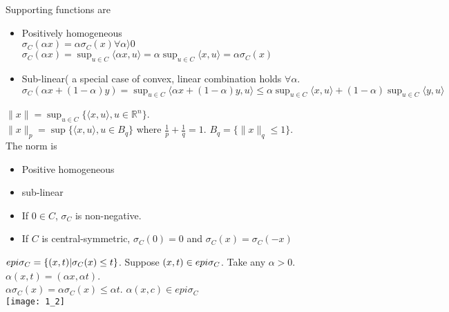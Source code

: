 \documentclass[11pt]{book} %
\def\R{\mathbb{R}}
\begin{document}
Supporting functions are
\begin{itemize}
\item Positively homogeneous\\
$\sigma_C(\alpha x) = \alpha \sigma_C(x) \forall \alpha \rangle  0$ \\
$\sigma_C(\alpha x ) = \sup_{u \in C} \langle \alpha x, u\rangle  = \alpha \sup_{u \in C} \langle x, u\rangle  = \alpha \sigma_C(x)$
\item Sub-linear( a special case of convex, linear combination holds $\forall \alpha$.\\
$\sigma_C(\alpha x + (1 - \alpha) y ) = \sup_{u \in C} \langle \alpha x + (1 - \alpha) y,u\rangle  \le \alpha\sup_{u \in C}\langle x,u\rangle  + (1 - \alpha)\sup_{u \in C}\langle y,u\rangle  $
\end{itemize}
\begin{example}[L2-norm]
$\| x \| = \sup_{u \in C} \{ \langle x, u \rangle, u \in \R^n \}$.\\
$\|x \|_p = \sup \{ \langle x, u \rangle, u \in B_q \}$ where $\frac{1}{p} + \frac{1}{q} = 1$. $B_q = \{ \|x \|_q \le 1\}$.\\
The norm is 
\begin{itemize}
\item Positive homogeneous
\item sub-linear
\item If $0 \in C$, $\sigma_C$ is non-negative.
\item If $C$ is central-symmetric, $\sigma_C(0) = 0$ and $\sigma_C(x) = \sigma_C(-x)$
\end{itemize}
\end{example}

\begin{fact}
$epi \space \sigma_C = \{ (x,t) | \sigma_C(x) \le t\}$.
Suppose $(x,t) \in epi \space \sigma_C$. Take any  $\alpha > 0$. $\alpha(x,t) = (\alpha x, \alpha t)$.\\
$\alpha \sigma_C(x) = \alpha \sigma_C(x) \le \alpha t$. $\alpha(x,c) \in epi 
\sigma_C$\\
\texttt{[image: 1\_2]}
\end{fact}
\end{document}
